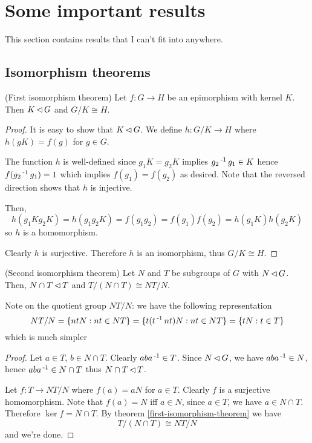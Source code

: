 \documentclass[12pt]{article}
\begin{document}
\newpage
\section{Some important results}
This section contains results that I can't fit into anywhere.
\subsection{Isomorphism theorems}
	\begin{theorem}\label{first-isomorphism-theorem}
		(First isomorphism theorem) Let $f: G\to H$ be an epimorphism with kernel $K$. Then $K \operatorname{\vartriangleleft} G$ and $G/K \cong H$.
	\end{theorem}
	\begin{proof}
		It is easy to show that $K \operatorname{\vartriangleleft} G$. We define $h: G/K \to H$ where $h(gK) = f(g)$ for $g\in G$. 

		The function $h$ is well-defined since $g_1 K = g_2 K$ implies $g_2\operatorname{^{-1}} g_1 \in K$ hence $f(g_2\operatorname{^{-1}} g_1) = 1$ which implies $f(g_1)=f(g_2)$ as desired. Note that the reversed direction shows that $h$ is injective.

		Then, 
		$$h(g_1Kg_2K) = h(g_1g_2K) = f(g_1g_2) = f(g_1)f(g_2) = h(g_1K)h(g_2K)$$
		so $h$ is a homomorphism.

		Clearly $h$ is surjective. Therefore $h$ is an isomorphism, thus $G/K \cong H$.
	\end{proof}

	\begin{theorem}\label{second-isomorphism-theorem}
		(Second isomorphism theorem) Let $N$ and $T$ be subgroups of $G$ with $N \operatorname{\vartriangleleft} G$. Then, $N\cap T \operatorname{\vartriangleleft} T$ and $T/(N \cap T) \cong NT/N$.
	\end{theorem}

	Note on the quotient group $NT/N$: we have the following representation
	$$NT/N = \{ntN : nt\in NT\} = \{t(t\operatorname{^{-1}} nt)N : nt\in NT\} = \{tN : t\in T\}$$
	which is much simpler

	\begin{proof}
		Let $a\in T$, $b\in N\cap T$. Clearly $aba\operatorname{^{-1}} \in T$. Since $N\operatorname{\vartriangleleft} G$, we have $aba\operatorname{^{-1}} \in N$, hence $aba\operatorname{^{-1}} \in N\cap T$ thus $N\cap T \operatorname{\vartriangleleft} T$.

		Let $f: T \to NT/N$ where $f(a) = aN$ for $a\in T$. Clearly $f$ is a surjective homomorphism. Note that $f(a) = N$ iff $a\in N$, since $a\in T$, we have $a\in N\cap T$. Therefore $\ker f = N\cap T$. By theorem \ref{first-isomorphism-theorem} we have
		$$T/(N\cap T) \cong NT/N$$
		and we're done. 
	\end{proof}
\end{document}
